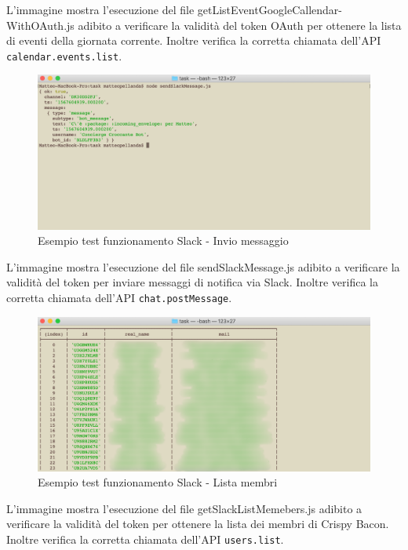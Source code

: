 \newpage
\noindent L'immagine mostra l'esecuzione del file getListEventGoogleCallendar-WithOAuth.js adibito a verificare la validità del token OAuth per ottenere la lista di eventi della giornata corrente. Inoltre verifica la corretta chiamata dell'API \texttt{calendar.events.list}.
\\[0.1cm]
\begin{figure}[H]
	\includegraphics[width=13.2cm]{immagini/test-sendSlack.png}
	\caption{\label{fig:test_slack_send}Esempio test funzionamento Slack - Invio messaggio}
\end{figure}
\noindent L'immagine mostra l'esecuzione del file sendSlackMessage.js adibito a verificare la validità del token per inviare messaggi di notifica via Slack. Inoltre verifica la corretta chiamata dell'API \texttt{chat.postMessage}.
\\[0.1cm]
\begin{figure}[H]
	\includegraphics[width=13.2cm]{immagini/test-listSlack.png}
	\caption{\label{fig:test_slack_list}Esempio test funzionamento Slack - Lista membri}
\end{figure}
\noindent L'immagine mostra l'esecuzione del file getSlackListMemebers.js adibito a verificare la validità del token per ottenere la lista dei membri di Crispy Bacon. Inoltre verifica la corretta chiamata dell'API \texttt{users.list}.


